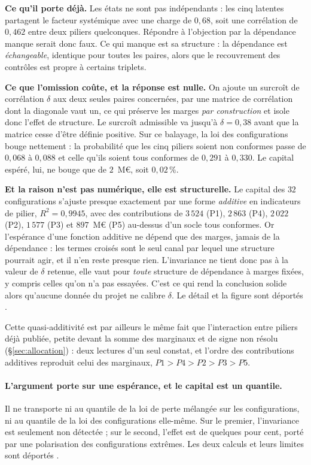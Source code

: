 \textbf{Ce qu'il porte déjà.} Les états ne sont pas indépendants : les cinq latentes partagent le
facteur systémique avec une charge de $0{,}68$, soit une corrélation de $0{,}462$ entre deux
piliers quelconques. Répondre à l'objection par \og{}la dépendance manque\fg{} serait donc faux.
Ce qui manque est sa structure : la dépendance est \emph{échangeable}, identique pour
toutes les paires, alors que le recouvrement des contrôles est propre à certains triplets.

\textbf{Ce que l'omission coûte, et la réponse est nulle.} On ajoute un surcroît de corrélation
$\delta$ aux deux seules paires concernées, par une matrice de corrélation dont la diagonale
vaut un, ce qui préserve les marges \emph{par construction} et isole donc l'effet de structure.
Le surcroît admissible va jusqu'à $\delta = 0{,}38$ avant que la matrice cesse d'être définie
positive. Sur ce balayage, la loi des configurations bouge nettement : la probabilité que les
cinq piliers soient non conformes passe de $0{,}068$ à $0{,}088$ et celle qu'ils soient tous
conformes de $0{,}291$ à $0{,}330$. Le capital espéré, lui, ne bouge que de $2$~M\euro, soit
$0{,}02\,\%$.

\textbf{Et la raison n'est pas numérique, elle est structurelle.} Le capital des $32$
configurations s'ajuste presque exactement par une forme \emph{additive} en indicateurs de
pilier, $R^2 = 0{,}9945$, avec des contributions de $3\,524$ (P1), $2\,863$ (P4), $2\,022$ (P2),
$1\,577$ (P3) et $897$~M\euro{} (P5) au-dessus d'un socle tous conformes. Or l'espérance d'une
fonction additive ne dépend que des marges, jamais de la dépendance : les termes croisés
sont le seul canal par lequel une structure pourrait agir, et il n'en reste presque rien.
L'invariance ne tient donc pas à la valeur de $\delta$ retenue, elle vaut pour \emph{toute}
structure de dépendance à marges fixées, y compris celles qu'on n'a pas essayées. C'est ce qui
rend la conclusion solide alors qu'aucune donnée du projet ne calibre $\delta$. Le détail et la
figure sont déportés \matcomp.

Cette quasi-additivité est par ailleurs le même fait que l'interaction entre piliers déjà
publiée, petite devant la somme des marginaux et de signe non résolu (\S\ref{sec:allocation}) :
deux lectures d'un seul constat, et l'ordre des contributions additives reproduit celui des
marginaux, $P1 > P4 > P2 > P3 > P5$.

\paragraph{L'argument porte sur une espérance, et le capital est un quantile.} Il ne
transporte ni au quantile de la loi de perte mélangée sur les configurations, ni au quantile de
la loi des configurations elle-même. Sur le premier, l'invariance est seulement non détectée ;
sur le second, l'effet est de quelques pour cent, porté par une polarisation des configurations
extrêmes. Les deux calculs et leurs limites sont déportés \matcomp.


